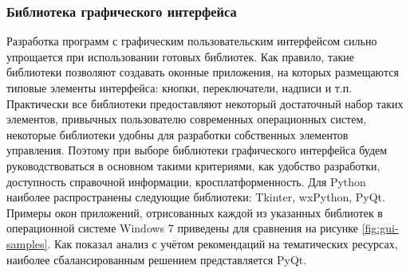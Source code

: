 \documentclass[12pt]{diploma}
\begin{document}
	\subsubsection{Библиотека графического интерфейса}
	Разработка программ с графическим пользовательским интерфейсом сильно упрощается при использовании готовых библиотек. Как правило, такие библиотеки позволяют создавать оконные приложения, на которых размещаются типовые элементы интерфейса: кнопки, переключатели, надписи и т.п. Практически все библиотеки предоставляют некоторый достаточный набор таких элементов, привычных пользователю современных операционных систем, некоторые библиотеки удобны для разработки собственных элементов управления. Поэтому при выборе библиотеки графического интерфейса будем руководствоваться в основном такими критериями, как удобство разработки, доступность справочной информации, кросплатформенность. Для Python наиболее распространены следующие библиотеки: Tkinter, wxPython, PyQt. Примеры окон приложений, отрисованных каждой из указанных библиотек в операционной системе Windows 7 приведены для сравнения на рисунке \ref{fig:gui-samples}. Как показал анализ с учётом рекомендаций на тематических ресурсах, наиболее сбалансированным решением представляется PyQt. 
	
\end{document}

